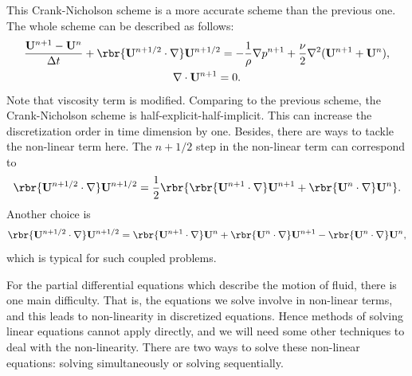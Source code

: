 \documentclass[english, nochinese]{pkupaper}
\begin{document}
This Crank-Nicholson scheme is a more accurate scheme than the previous one. The whole scheme can be described as follows:
\begin{equation}
\begin{gathered}
\frac{\mathbf{U}^{n+1} - \mathbf{U}^n}{\Delta t} + \rbr{\mathbf{U}^{n+1/2}\cdot\nabla} \mathbf{U}^{n+1/2} = - \frac{1}{\rho} \nabla p^{n+1} +  \frac{\nu}{2}\nabla^2(\mathbf{U}^{n+1} + \mathbf{U}^n), \\
\nabla\cdot \mathbf{U}^{n+1} = 0.
\end{gathered}
\end{equation}
Note that viscosity term is modified. Comparing to the previous scheme, the Crank-Nicholson scheme is half-explicit-half-implicit. This can increase the discretization order in time dimension by one. Besides, there are ways to tackle the non-linear term here. The $n+1/2$ step in the non-linear term can correspond to
\begin{equation}
\rbr{\mathbf{U}^{n+1/2}\cdot\nabla}\mathbf{U}^{n+1/2} = \frac{1}{2} \rbr{ \rbr{ \mathbf{U}^{ n + 1 } \cdot \nabla } \mathbf{U}^{ n + 1 } + \rbr{ \mathbf{U}^n \cdot \nabla } \mathbf{U}^n }.
\end{equation}
Another choice is
\begin{equation}
\rbr{\mathbf{U}^{n+1/2}\cdot\nabla}\mathbf{U}^{n+1/2} = \rbr{\mathbf{U}^{n+1}\cdot\nabla}\mathbf{U}^n +\rbr{\mathbf{U}^n\cdot\nabla}\mathbf{U}^{n+1} - \rbr{\mathbf{U}^n\cdot\nabla}\mathbf{U}^n,
\end{equation}
which is typical for such coupled problems.



For the partial differential equations which describe the motion of fluid, there is one main difficulty. That is, the equations we solve involve in non-linear terms, and this leads to non-linearity in discretized equations. Hence methods of solving linear equations cannot apply directly, and we will need some other techniques to deal with the non-linearity. There are two ways to solve these non-linear equations: solving simultaneously or solving sequentially.

\end{document}

